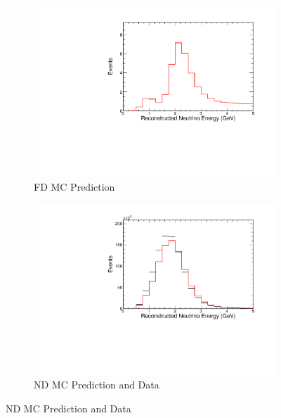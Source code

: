 {\begin{figure}
\end{figure}





\begin{figure}
\begin{center}
\begin{subfigure}[c]{0.49\textwidth}
\includegraphics[width=\textwidth]{figures/systs/prediction/fd_mc_prediction_MaNCEL.pdf}
\caption*{FD MC Prediction}
\end{subfigure}
\begin{subfigure}[c]{0.49\textwidth}
\includegraphics[width=\textwidth]{figures/systs/prediction/nd_mc_prediction_MaNCEL.pdf}
\caption*{ND MC Prediction and Data}
\end{subfigure}


\end{center}
\end{figure}}
